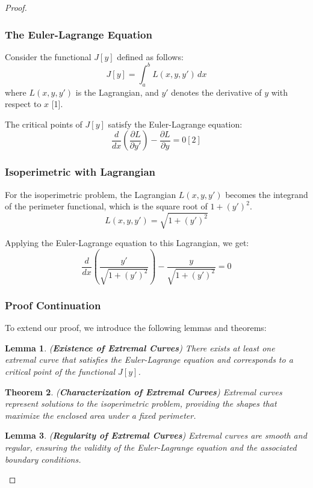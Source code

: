 \documentclass[a4paper]{book}
\newtheorem{theorem}{Theorem}%
\newtheorem{lemma}[theorem]{Lemma}%
\begin{document}
\begin{proof}
    \subsubsection{The Euler-Lagrange Equation}

    Consider the functional \( J[y] \) defined as follows:
    \[ J[y] = \int_{a}^{b} L(x, y, y') \, dx \]
    where \( L(x, y, y') \) is the Lagrangian, and \( y' \) denotes the derivative of \( y \) with respect to \( x \) [1].

    The critical points of \( J[y] \) satisfy the Euler-Lagrange equation:
    \[ \frac{d}{dx} \left( \frac{\partial L}{\partial y'} \right) - \frac{\partial L}{\partial y} = 0 [2] \]

    \subsubsection{Isoperimetric with Lagrangian}

    For the isoperimetric problem, the Lagrangian \( L(x, y, y') \) becomes the integrand of the perimeter functional, which is the square root of \( 1 + (y')^2 \).
    \[ L(x, y, y') = \sqrt{1 + (y')^2} \]

    Applying the Euler-Lagrange equation to this Lagrangian, we get:
    \[ \frac{d}{dx} \left( \frac{y'}{\sqrt{1 + (y')^2}} \right) - \frac{y}{\sqrt{1 + (y')^2}} = 0 \]

    \subsubsection{Proof Continuation}

    To extend our proof, we introduce the following lemmas and theorems:

    \begin{lemma}(\textbf{Existence of Extremal Curves})
        There exists at least one extremal curve that satisfies the Euler-Lagrange equation and corresponds to a critical point of the functional \( J[y] \).
    \end{lemma}

    \begin{theorem}(\textbf{Characterization of Extremal Curves})
        Extremal curves represent solutions to the isoperimetric problem, providing the shapes that maximize the enclosed area under a fixed perimeter.
    \end{theorem}

    \begin{lemma}(\textbf{Regularity of Extremal Curves})
        Extremal curves are smooth and regular, ensuring the validity of the Euler-Lagrange equation and the associated boundary conditions.
    \end{lemma}


\end{proof}
\end{document}
